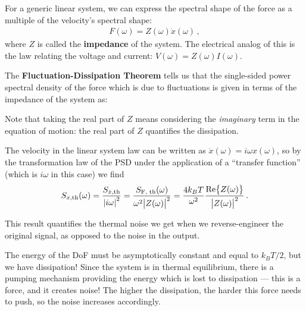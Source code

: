 \documentclass[main.tex]{subfiles}
\begin{document}
For a generic linear system, we can express the spectral shape of the force as a multiple of the velocity's spectral shape: 
%
\begin{align}
F(\omega ) = Z(\omega ) \dot{x}(\omega )
\,,
\end{align}
%
where \(Z\) is called the \textbf{impedance} of the system. The electrical analog of this is the law relating the voltage and current: \(V(\omega ) = Z(\omega ) I(\omega )\).

The \textbf{Fluctuation-Dissipation Theorem} tells us that the single-sided power spectral density of the force which is due to fluctuations is given in terms of the impedance of the system as:
%

Note that taking the real part of \(Z\) means considering the \emph{imaginary} term in the equation of motion: the real part of \(Z\) quantifies the dissipation. 


The velocity in the linear system law can be written as \(\dot{x}(\omega) = i \omega x(\omega )\), so by the transformation law of the PSD under the application of a ``transfer function'' (which is \(i \omega \) in this case) we find 
%
\begin{align}
S_{x, \text{th}} (\omega ) = \frac{S_{\dot{x}, \text{th}}}{\abs{i \omega }^2} 
= \frac{S _{\text{F, th}} (\omega )}{\omega^2 \abs{Z(\omega )}^2}
= \frac{4 k_B T}{\omega^2} \frac{\Re{Z(\omega )}}{\abs{Z(\omega )}^2} 
\,.
\end{align}

This result quantifies the thermal noise we get when we reverse-engineer the original signal, as opposed to the noise in the output.

The energy of the DoF must be asymptotically constant and equal to \(k_B T /2\), but we have dissipation! Since the system is in thermal equilibrium, there is a pumping mechanism providing the energy which is lost to dissipation --- this is a force, and it creates noise! 
The higher the dissipation, the harder this force needs to push, so the noise increases accordingly. 
\end{document}
